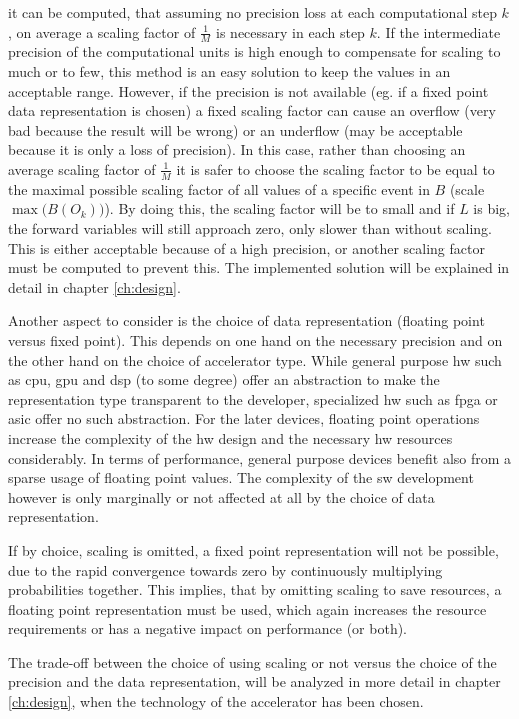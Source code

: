 \documentclass[mscthesis]{usiinfthesis}
\begin{document}
it can be computed, that assuming no precision loss at each computational step
$k$, on average a scaling factor of $\frac{1}{M}$ is necessary in each step
$k$. If the intermediate precision of the computational units is high enough to
compensate for scaling to much or to few, this method is an easy solution to
keep the values in an acceptable range. However, if the precision is not
available (eg. if a fixed point data representation is chosen) a fixed scaling
factor can cause an overflow (very bad because the result will be wrong) or an
underflow (may be acceptable because it is only a loss of precision). In this
case, rather than choosing an average scaling factor of $\frac{1}{M}$ it is
safer to choose the scaling factor to be equal to the maximal possible scaling
factor of all values of a specific event in $B$ (scale $\max\big(B(O_k)\big)$).
By doing this, the scaling factor will be to small and if $L$ is big, the
forward variables will still approach zero, only slower than without scaling.
This is either acceptable because of a high precision, or another scaling
factor must be computed to prevent this. The implemented solution will be
explained in detail in chapter \ref{ch:design}.

Another aspect to consider is the choice of data representation (floating point
versus fixed point). This depends on one hand on the necessary precision and on
the other hand on the choice of accelerator type. While general purpose
\gls{hw} such as \gls{cpu}, \gls{gpu} and \gls{dsp} (to some degree) offer an
abstraction to make the representation type transparent to the developer,
specialized \gls{hw} such as \gls{fpga} or \gls{asic} offer no such
abstraction. For the later devices, floating point operations increase the
complexity of the \gls{hw} design and the necessary \gls{hw} resources
considerably. In terms of performance, general purpose devices benefit also
from a sparse usage of floating point values. The complexity of the \gls{sw}
development however is only marginally or not affected at all by the choice of
data representation.

If by choice, scaling is omitted, a fixed point representation will not be
possible, due to the rapid convergence towards zero by continuously multiplying
probabilities together. This implies, that by omitting scaling to save
resources, a floating point representation must be used, which again increases
the resource requirements or has a negative impact on performance (or both).

The trade-off between the choice of using scaling or not versus the choice of
the precision and the data representation, will be analyzed in more detail in
chapter \ref{ch:design}, when the technology of the accelerator has been
chosen.
\end{document}
